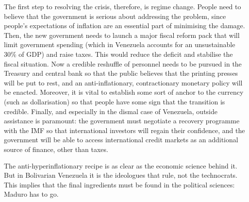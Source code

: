    The first step to resolving the crisis, therefore, is regime change.
   People need to believe that the government is serious about addressing
   the problem, since people's expectations of inflation are an essential
   part of minimising the damage. Then, the new government needs to launch
   a major fiscal reform pack that will limit government spending (which
   in Venezuela accounts for an unsustainable 30\% of GDP) and raise taxes.
   This would reduce the deficit and stabilise the fiscal situation. Now a
   credible reshuffle of personnel needs to be pursued in the Treasury and
   central bank so that the public believes that the printing presses will
   be put to rest, and an anti-inflationary, contractionary monetary
   policy will be enacted. Moreover, it is vital to establish some sort of
   anchor to the currency (such as dollarisation) so that people have some
   sign that the transition is credible. Finally, and especially in the
   dismal case of Venezuela, outside assistance is paramount: the
   government must negotiate a recovery programme with the IMF so that
   international investors will regain their confidence, and the
   government will be able to access international credit markets as an
   additional source of finance, other than taxes.

   The anti-hyperinflationary recipe is as clear as the economic science
   behind it. But in Bolivarian Venezuela it is the ideologues that rule,
   not the technocrats. This implies that the final ingredients must be
   found in the political sciences: Maduro has to go.

